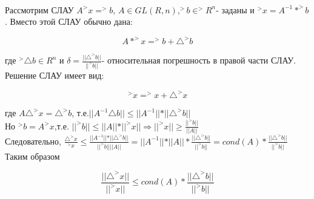 \documentclass[__main__.tex]{subfiles}
\begin{document}
\begin{definition}\\
	Рассмотрим СЛАУ $A ^>x = ^>b$, $A\in GL(R,n), ^>b\in ^>R^n$- заданы и $^>x=A^{-1}* ^>b$.
	Вместо этой СЛАУ обычно дана:
	
	$$A* ^>x= ^>b + \triangle^> b$$
	
	где $^>\triangle b \in R^n$ и $\delta=\frac{\vert\vert\triangle^> b\vert\vert}{\vert\vert ^>b\vert\vert}$- относительная погрешность в правой части СЛАУ.\\
	Решение СЛАУ имеет вид:
	
	$$^>x=^>x + \triangle^> x$$
	
	где $A \triangle^> x=  \triangle^> b$, т.е.$\vert\vert A^{-1} \triangle b \vert\vert \leq \vert\vert A^{-1}\vert\vert *\vert\vert \triangle^> b\vert\vert$\\
	Но $^>b=A ^>x$,т.е. $\vert\vert ^>b\vert\vert \leq \vert\vert A\vert\vert*\vert\vert^>x\vert\vert \Rightarrow \vert\vert ^>x\vert\vert \geq \frac{\vert\vert^>b\vert\vert}{\vert\vert A \vert\vert}$\\
	Следовательно, $\frac{\triangle^> x}{^>x}\leq \frac{\vert\vert A^{-1}\vert\vert * \vert\vert \triangle^> b \vert\vert}{\vert\vert ^>b \vert\vert \vert\vert A\vert\vert}=\vert\vert A^{-1}\vert\vert * \vert\vert A \vert\vert * \frac{\vert\vert \triangle^> b\vert\vert}{\vert\vert ^>b \vert\vert}= cond(A)*\frac{\vert\vert \triangle^> b\vert\vert}{\vert\vert ^>b \vert\vert}$\\
	Таким образом 
	
	$$\frac{\vert\vert  \triangle^> x \vert\vert}{\vert\vert ^>x\vert\vert}\leq cond(A)*\frac{\vert\vert \triangle^> b\vert\vert}{\vert\vert ^>b \vert\vert}$$
\end{definition}
\end{document}

